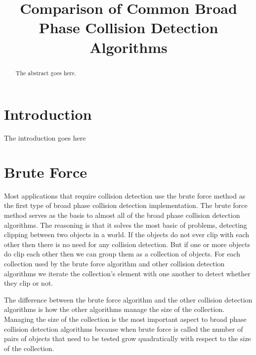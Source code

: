 \documentclass[conference]{IEEEtran}
\begin{document}
\title{Comparison of Common Broad Phase Collision Detection Algorithms}

\author{
}

\maketitle

\begin{abstract}
The abstract goes here.
\end{abstract}

\section{Introduction}
The introduction goes here

\section{Brute Force}

Most applications that require collision detection use the brute force method as the first type of broad phase collision detection implementation. The brute force method serves as the basis to almost all of the broad phase collision detection algorithms. The reasoning is that it solves the most basic of problems, detecting clipping between two objects in a world. If the objects do not ever clip with each other then there is no need for any collision detection. But if one or more objects do clip each other then we can group them as a collection of objects. For each collection used by the brute force algorithm and other collision detection algorithms we iterate the collection's element with one another to detect whether they clip or not.

The difference between the brute force algorithm and the other collision detection algorithms is how the other algorithms manage the size of the collection. Managing the size of the collection is the most important aspect to broad phase collision detection algorithms because when brute force is called the number of pairs of objects that need to be tested grow quadratically with respect to the size of the collection.
\end{document}
